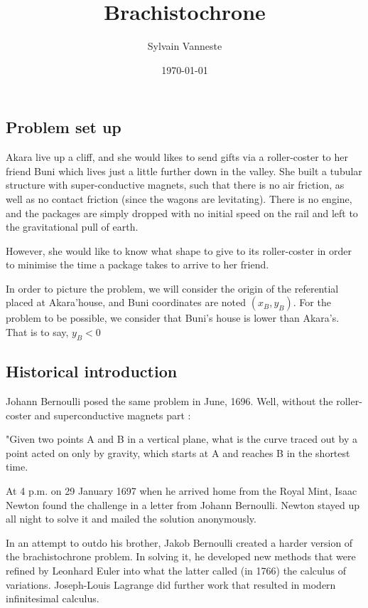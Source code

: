 \documentclass{article}
\title{Brachistochrone}
\author{Sylvain Vanneste}
\date\today
\begin{document}
\maketitle %


\subsection*{Problem set up}


Akara live up a cliff, and she would likes to send gifts via a roller-coster to her friend Buni which lives just a little further down in the valley. She built a tubular structure with super-conductive magnets, such that there is no air friction, as well as no contact friction (since the wagons are levitating). There is no engine, and the packages are simply dropped with no initial speed on the rail and left to the gravitational pull of earth.

However, she would like to know what shape to give to its roller-coster in order to minimise the time a package takes to arrive to her friend.



In order to picture the problem, we will consider the origin of the referential placed at Akara'house, and Buni coordinates are noted $(x_B, y_B)$. For the problem to be possible, we consider that Buni's house is lower than Akara's. That is to say, $y_B < 0$



\subsection*{Historical introduction}

Johann Bernoulli posed the same problem in June, 1696. Well, without the roller-coster and superconductive magnets part :

"Given two points A and B in a vertical plane, what is the curve traced out by a point acted on only by gravity, which starts at A and reaches B in the shortest time.

At 4 p.m. on 29 January 1697 when he arrived home from the Royal Mint, Isaac Newton found the challenge in a letter from Johann Bernoulli. Newton stayed up all night to solve it and mailed the solution anonymously.

In an attempt to outdo his brother, Jakob Bernoulli created a harder version of the brachistochrone problem. In solving it, he developed new methods that were refined by Leonhard Euler into what the latter called (in 1766) the calculus of variations. Joseph-Louis Lagrange did further work that resulted in modern infinitesimal calculus.
\end{document}
